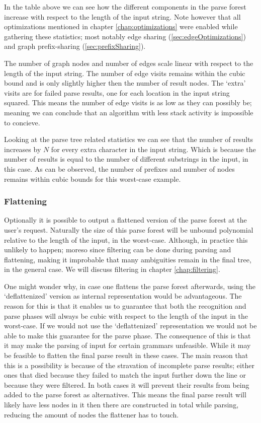 \documentclass[a4paper,10pt]{article}
\begin{document}
In the table above we can see how the different components in the parse forest increase with respect to the length of the input string. Note however that all optimizations mentioned in chapter \ref{chap:optimizations} were enabled while gathering these statistics; most notably edge sharing (\ref{sec:edgeOptimizations}) and graph prefix-sharing (\ref{sec:prefixSharing}).

The number of graph nodes and number of edges scale linear with respect to the length of the input string. The number of edge visits remains within the cubic bound and is only slightly higher then the number of result nodes. The `extra' visits are for failed parse results, one for each location in the input string squared. This means the number of edge visits is as low as they can possibly be; meaning we can conclude that an algorithm with less stack activity is impossible to concieve.

Looking at the parse tree related statistics we can see that the number of results increases by $N$ for every extra character in the input string. Which is because the number of results is equal to the number of different substrings in the input, in this case. As can be observed, the number of prefixes and number of nodes remains within cubic bounds for this worst-case example.

\subsubsection{Flattening}
Optionally it is possible to output a flattened version of the parse forest at the user's request. Naturally the size of this parse forest will be unbound polynomial relative to the length of the input, in the worst-case. Although, in practice this unlikely to happen; moreso since filtering can be done during parsing and flattening, making it improbable that many ambiguities remain in the final tree, in the general case. We will discuss filtering in chapter \ref{chap:filtering}.

One might wonder why, in case one flattens the parse forest afterwards, using the `deflattenized' version as internal representation would be advantageous. The reason for this is that it enables us to guarantee that both the recognition and parse phases will always be cubic with respect to the length of the input in the worst-case. If we would not use the `deflattenized' representation we would not be able to make this guarantee for the parse phase. The consequence of this is that it may make the parsing of input for certain grammars unfeasible. While it may be feasible to flatten the final parse result in these cases. The main reason that this is a possibility is because of the stravation of incomplete parse results; either ones that died because they failed to match the input further down the line or because they were filtered. In both cases it will prevent their results from being added to the parse forest as alternatives. This means the final parse result will likely have less nodes in it then there are constructed in total while parsing, reducing the amount of nodes the flattener has to touch.
\end{document}
